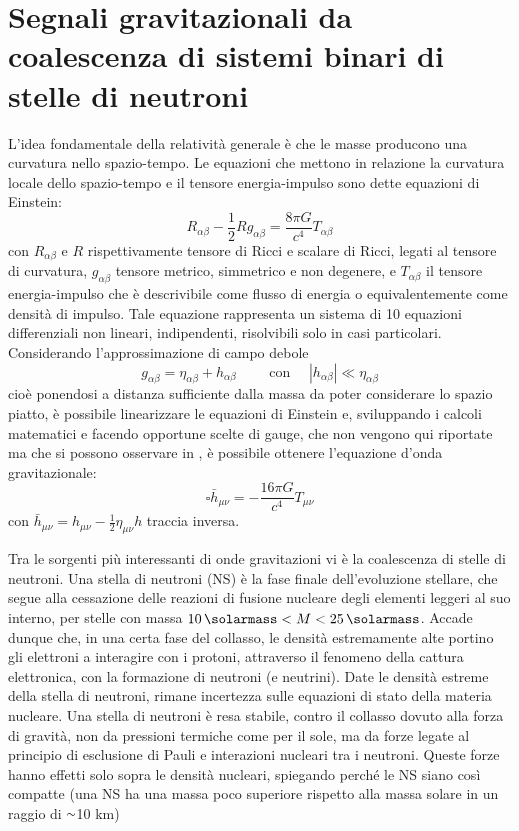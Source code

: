 \chapter{Segnali gravitazionali da coalescenza di  sistemi binari di stelle di neutroni}
\label{chapter:segnaleGWdaBNS}
L'idea fondamentale della relatività generale è che le masse producono una curvatura nello spazio-tempo. Le equazioni che mettono in relazione la curvatura locale dello spazio-tempo e il tensore energia-impulso sono dette equazioni di Einstein:
\begin{equation}
	R_{\alpha\beta} -\frac{1}{2}Rg_{\alpha\beta}=\frac{8\pi G}{c^4}T_{\alpha\beta}
\end{equation}
con $R_{\alpha\beta}$ e $R$ rispettivamente tensore di Ricci e scalare di Ricci, legati al tensore di curvatura, $g_{\alpha\beta}$ tensore metrico, simmetrico e non degenere, e $T_{\alpha\beta}$ il tensore energia-impulso che è descrivibile come flusso di energia o equivalentemente come densità di impulso.
Tale equazione rappresenta un sistema di 10 equazioni differenziali non lineari, indipendenti, risolvibili solo in casi particolari. \\
Considerando l'approssimazione di campo debole 
\begin{equation}
	g_{\alpha\beta} = \eta_{\alpha\beta} + h_{\alpha\beta}\quad\quad\text{ con }\quad |h_{\alpha\beta}|\ll \eta_{\alpha\beta} 
\end{equation}
cioè ponendosi a distanza sufficiente dalla massa da poter considerare lo spazio piatto, è possibile linearizzare le equazioni di Einstein e, sviluppando i calcoli matematici e facendo opportune scelte di gauge, che non vengono qui riportate ma che si possono osservare in \cite{maggiore2008gravitational}, è possibile ottenere l'equazione d'onda gravitazionale:
\begin{equation}
	\square\bar{h}_{\mu\nu} = -\frac{16\pi G}{c^4}T_{\mu\nu}
\end{equation}
con $\bar{h}_{\mu\nu} = h_{\mu\nu} - \frac{1}{2}\eta_{\mu\nu}h$ traccia inversa.

Tra le sorgenti più interessanti di onde gravitazioni vi è la coalescenza di stelle di neutroni.
Una stella di neutroni (NS) è la fase finale dell'evoluzione stellare, che segue alla cessazione delle reazioni di fusione nucleare degli elementi leggeri al suo interno, per stelle con massa $\SI{10}{\solarmass} < M < \SI{25}{\solarmass}$. Accade dunque che, in una certa fase del collasso, le densità estremamente alte portino gli elettroni a interagire con i protoni, attraverso il fenomeno della cattura elettronica, con la formazione di neutroni (e neutrini). Date le densità estreme della stella di neutroni, rimane incertezza sulle equazioni di stato della materia nucleare\cite{hobson2006general}.
Una stella di neutroni è resa stabile, contro il collasso dovuto alla forza di gravità, non da pressioni termiche come per il sole, ma da forze legate al principio di esclusione di Pauli e interazioni nucleari tra i neutroni. Queste forze hanno effetti solo sopra le densità nucleari, spiegando perché le NS siano così compatte (una NS ha una massa poco superiore rispetto alla massa solare in un raggio di $\smallsim$10 km)\cite{hartle2003gravity}

